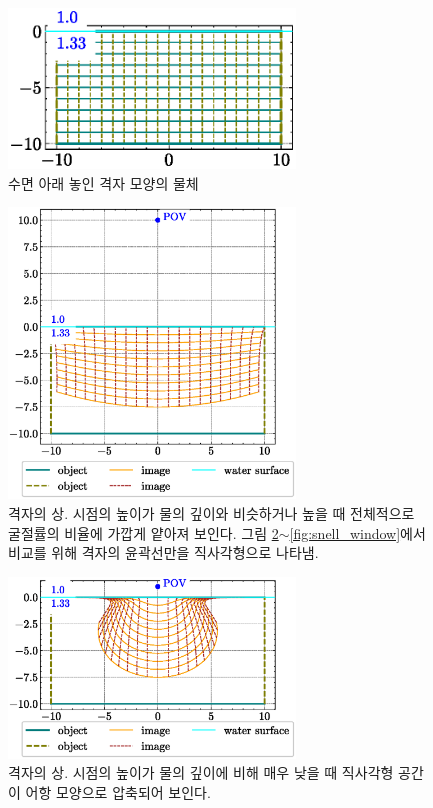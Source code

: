 \documentclass[twocolumn]{article}
\begin{document}
\begin{figure}
	\centering
	\includegraphics[width=3in]{figs/grid_underwater.eps}
	\caption{수면 아래 놓인 격자 모양의 물체}
	\label{fig:grid_underwater}
\end{figure}

\begin{figure}
	\centering
	\includegraphics[width=3in]{figs/image_underwater1.eps}
	\caption{격자의 상. 시점의 높이가 물의 깊이와 비슷하거나 높을 때 전체적으로 굴절률의 비율에 가깝게 얕아져 보인다. 그림 \ref{fig:image_underwater}$\sim$\ref{fig:snell_window}에서 비교를 위해 격자의 윤곽선만을 직사각형으로 나타냄. }
	\label{fig:image_underwater}
\end{figure}

\begin{figure}
	\centering
	\includegraphics[width=3in]{figs/fishjar.eps}
	\caption{격자의 상. 시점의 높이가 물의 깊이에 비해 매우 낮을 때 직사각형 공간이 어항 모양으로 압축되어 보인다.}
	\label{fig:fishbowl}
\end{figure}
\end{document}
